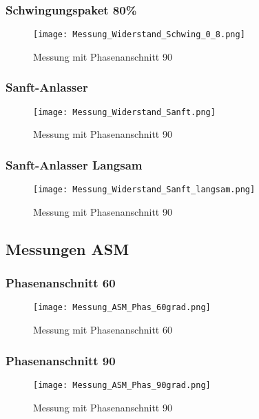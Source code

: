 \newpage
\subsubsection{Schwingungspaket 80\%}
\begin{figure}[ht!]
	\centering
	\texttt{[image: Messung\_Widerstand\_Schwing\_0\_8.png]}	
	\caption{Messung mit Phasenanschnitt 90\textdegree}\label{fig:Mess_Schwing_80}
\end{figure}

\newpage
\subsubsection{Sanft-Anlasser}
\begin{figure}[ht!]
	\centering
	\texttt{[image: Messung\_Widerstand\_Sanft.png]}	
	\caption{Messung mit Phasenanschnitt 90\textdegree}\label{fig:Mess_Sanft}
\end{figure}

\newpage
\subsubsection{Sanft-Anlasser Langsam}
\begin{figure}[ht!]
	\centering
	\texttt{[image: Messung\_Widerstand\_Sanft\_langsam.png]}	
	\caption{Messung mit Phasenanschnitt 90\textdegree}\label{fig:Mess_Sanft_langsam}
\end{figure}

\newpage
\subsection{Messungen ASM}

\subsubsection{Phasenanschnitt 60\textdegree}
\begin{figure}[ht!]
	\centering
	\texttt{[image: Messung\_ASM\_Phas\_60grad.png]}	
	\caption{Messung mit Phasenanschnitt 60\textdegree}\label{fig:Mess_ASM_Phas60}
\end{figure}

\newpage
\subsubsection{Phasenanschnitt 90\textdegree}
\begin{figure}[ht!]
	\centering
	\texttt{[image: Messung\_ASM\_Phas\_90grad.png]}	
	\caption{Messung mit Phasenanschnitt 90\textdegree}\label{fig:Mess_ASM_Phas90}
\end{figure}


